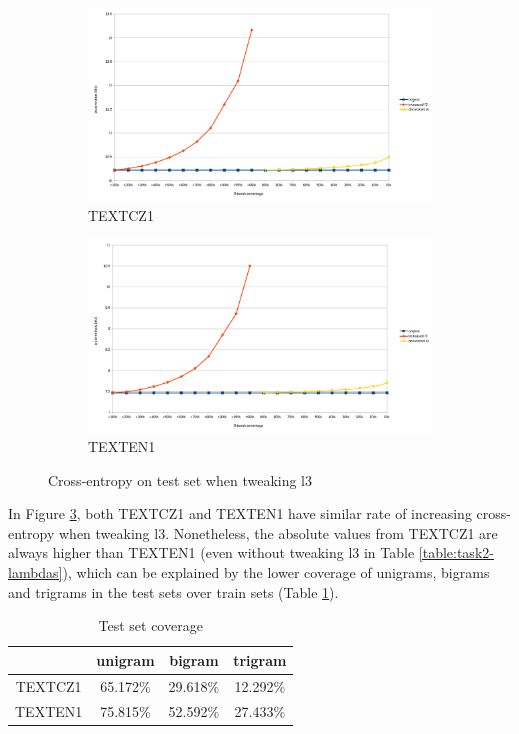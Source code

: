 \documentclass{article}
\begin{document}
\begin{figure}[h]
    \begin{subfigure}{\textwidth}
        \includegraphics[width=0.9\linewidth]{task2-cz.png} 
        \caption{TEXTCZ1}
        \label{fig:subim1}
    \end{subfigure}
    
    \begin{subfigure}{\textwidth}
        \includegraphics[width=0.9\linewidth]{task2-en.png}
        \caption{TEXTEN1}
        \label{fig:subim2}
    \end{subfigure}
     
    \caption{Cross-entropy on test set when tweaking l3}
    \label{fig:task2}
\end{figure}

In Figure \ref{fig:task2}, both TEXTCZ1 and TEXTEN1 have similar rate of increasing cross-entropy when tweaking l3. Nonetheless, the absolute values from TEXTCZ1 are always higher than TEXTEN1 (even without tweaking l3 in Table \ref{table:task2-lambdas}), which can be explained by the lower coverage of unigrams, bigrams and trigrams in the test sets over train sets (Table \ref{table:task2-cov}).

\begin{table}[h]
    \centering
    \begin{tabular}{|c|c|c|c|} 
        \hline
        & unigram & bigram & trigram \\
        \hline
        TEXTCZ1 & 65.172\% & 29.618\% & 12.292\% \\
        \hline
        TEXTEN1 & 75.815\% & 52.592\% & 27.433\% \\
        \hline
    \end{tabular}
    \caption{Test set coverage}
    \label{table:task2-cov}
\end{table}
\end{document}
